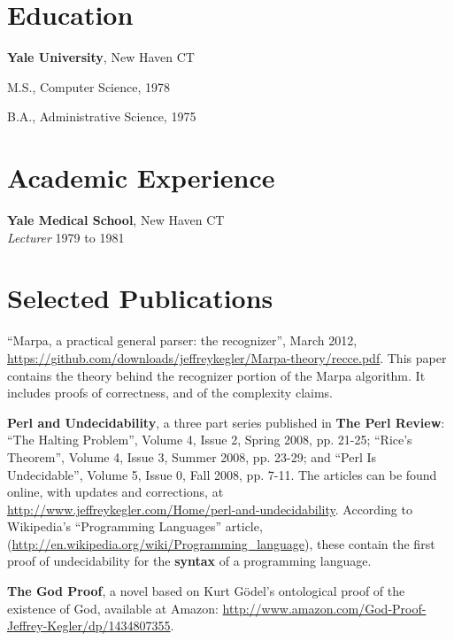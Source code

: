 \documentclass[12pt,margin,line]{res}
\newenvironment{mylist}{
  \begin{list}{}
  {%
      \setlength{\itemsep}{0in}%
      \setlength{\leftmargin}{0.2in}%
      \setlength{\parsep}{0in}%
      \setlength{\parskip}{0in}%
      \setlength{\partopsep}{0in}%
      \setlength{\topsep}{0in}%
  }
}
{\end{list}}
\begin{document}
\address{\url{http:://www.jeffreykegler.com/}}

\begin{resume}

\section{\sc Education}
{\bf Yale University}, New Haven CT
\begin{mylist}
\item[] M.S., Computer Science,  1978
\item[] B.A., Administrative Science,  1975
\end{mylist}

\section{\sc Academic Experience}
{\bf Yale Medical School}, New Haven CT \\
{\em Lecturer} \hfill 1979 to 1981\\
\vspace{-.2in}

\section{\sc Selected Publications}

\begin{sloppypar}
``Marpa, a practical general parser: the recognizer'',
March 2012,
\url{https://github.com/downloads/jeffreykegler/Marpa-theory/recce.pdf}.
This paper contains the theory behind the
recognizer portion of the
Marpa algorithm.
It includes proofs of correctness, and of the complexity claims.
\end{sloppypar}

{\bf Perl and Undecidability}, a three part series published
in {\bf The Perl Review}:
``The Halting Problem'', Volume 4, Issue 2, Spring 2008, pp. 21-25;
``Rice's Theorem'', Volume 4, Issue 3, Summer 2008, pp. 23-29; and
``Perl Is Undecidable'', Volume 5, Issue 0, Fall 2008, pp. 7-11.
The articles can be found online, with updates and corrections,
at \url{http://www.jeffreykegler.com/Home/perl-and-undecidability}.
According to Wikipedia's ``Programming Languages'' article,
(\url{http://en.wikipedia.org/wiki/Programming_language}),
these contain the first proof of undecidability for the {\bf syntax}
of a programming language.

{\bf The God Proof},
a novel based on Kurt G\"{o}del's
ontological proof of the existence
of God,
available at Amazon:
\url{http://www.amazon.com/God-Proof-Jeffrey-Kegler/dp/1434807355}.


\end{resume}
\end{document}
